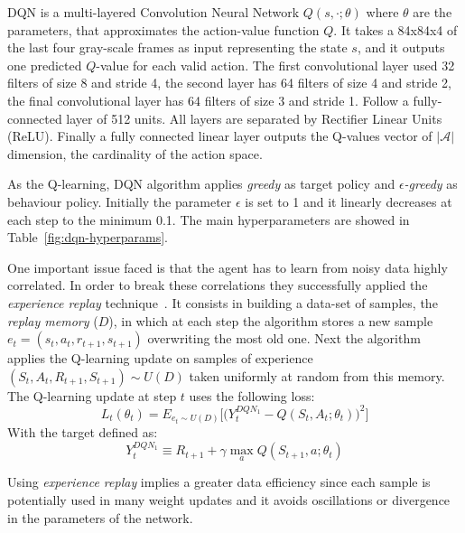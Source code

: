 DQN is a multi-layered Convolution Neural Network $Q(s, \cdotp; \theta)$ where $\theta$ are the parameters, that approximates the action-value function $Q$. It takes a 84x84x4 of the last four gray-scale frames as input representing the state $s$, and it outputs one predicted $Q$-value for each valid action.  
The first convolutional layer used 32 filters of size 8 and stride 4, the second layer has 64 filters of size 4 and stride 2, the final convolutional layer has 64 filters of size 3 and stride 1. Follow a fully-connected layer of 512 units. All layers are separated by Rectifier Linear Units (ReLU). Finally a fully connected linear layer outputs the Q-values vector of $|\mathcal{A}|$ dimension, the cardinality of the action space.

As the Q-learning, DQN algorithm applies \textit{greedy} as target policy and \textit{$\epsilon$-greedy} as behaviour policy. Initially the parameter $\epsilon$ is set to 1 and it linearly decreases at each step to the minimum 0.1. The main hyperparameters are showed in Table~\ref{fig:dqn-hyperparams}.

One important issue faced is that the agent has to learn from noisy data highly correlated. In order to break these correlations they successfully applied the \textit{experience replay} technique~\cite{Lin:1992:RLR:168871}. It consists in building a data-set of samples, the \textit{replay memory} ($D$), in which at each step the algorithm stores a new sample $e_t = (s_t, a_t, r_{t+1}, s_{t+1})$ overwriting the most old one. Next the algorithm applies the Q-learning update on samples of experience $(S_t, A_t, R_{t+1}, S_{t+1}) \sim U(D)$ taken uniformly at random from this memory. The Q-learning update at step $t$ uses the following loss:
\begin{equation}
	L_t(\theta_t) = E_{e_t \sim U(D)} %
		\Big[ \Big( Y^{DQN_1}_t - Q(S_t, A_t;\theta_t) \Big)^2 \Big]
\end{equation}
With the target defined as:
\begin{equation}
Y^{DQN_1}_t \equiv R_{t+1} + \gamma \max_{a} Q(S_{t+1}, a; \theta_t)
\end{equation}

Using \textit{experience replay} implies a greater data efficiency since each sample is potentially used in many weight updates and it avoids oscillations or divergence in the parameters of the network.


